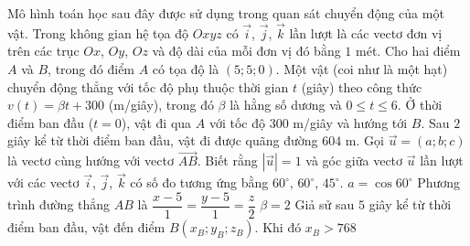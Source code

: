 \begin{ex}[TN2025-0101]%
    Mô hình toán học sau đây được sử dụng trong quan sát chuyển động của một vật. Trong không gian hệ tọa độ $Oxyz$ có $\overrightarrow{i}$, $\overrightarrow{j}$, $\overrightarrow{k}$ lần lượt là các vectơ đơn vị trên các trục $Ox$, $Oy$, $Oz$ và độ dài của mỗi đơn vị đó bằng $1$ mét. Cho hai điểm $A$ và $B$, trong đó điểm $A$ có tọa độ là $(5;5;0)$. Một vật (coi như là một hạt) chuyển động thẳng với tốc độ phụ thuộc thời gian $t$ (giây) theo công thức $v(t)=\beta t+300$ (m/giây), trong đó $\beta$ là hằng số dương và $0\leq t\leq 6$. Ở thời điểm ban đầu ($t=0$), vật đi qua $A$ với tốc độ $300$ m/giây và hướng tới $B$. Sau $2$ giây kể từ thời điểm ban đầu, vật đi được quãng đường $604$ m. Gọi $\overrightarrow{u}=(a;b;c)$ là vectơ cùng hướng với vectơ $\overrightarrow{AB}$. Biết rằng $|\overrightarrow{u}|=1$ và góc giữa vectơ $\overrightarrow{u}$ lần lượt với các vectơ $\overrightarrow{i}$, $\overrightarrow{j}$, $\overrightarrow{k}$ có số đo tương ứng bằng $60^\circ$, $60^\circ$, $45^\circ$.
    \choiceTF
    {\True $a=\cos 60^\circ$}
    {Phương trình đường thẳng $AB$ là $\dfrac{x-5}{1}=\dfrac{y-5}{1}=\dfrac{z}{2}$}
    {\True $\beta=2$}
    {Giả sử sau $5$ giây kể từ thời điểm ban đầu, vật đến điểm $B(x_B;y_B;z_B)$. Khi đó $x_B>768$}
\end{ex}
